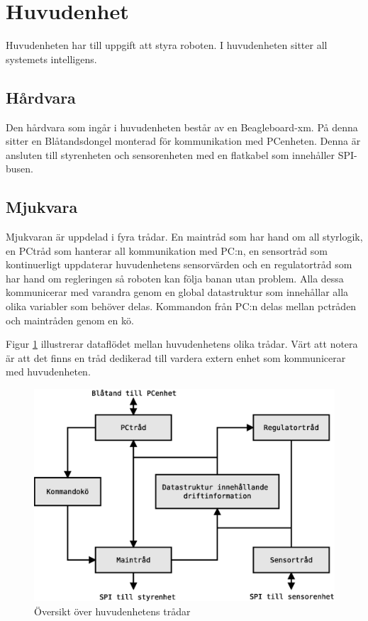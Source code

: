 
\section{Huvudenhet}
Huvudenheten har till uppgift att styra roboten. I huvudenheten sitter all systemets intelligens.

\subsection{Hårdvara}
Den hårdvara som ingår i huvudenheten består av en Beagleboard-xm. På denna sitter en Blåtandsdongel monterad för kommunikation med PCenheten. Denna är ansluten till styrenheten och sensorenheten med en flatkabel som innehåller SPI-busen.

\subsection{Mjukvara}
Mjukvaran är uppdelad i fyra trådar. En maintråd som har hand om all styrlogik, en PCtråd som hanterar all kommunikation med PC:n, en sensortråd som kontinuerligt uppdaterar huvudenhetens sensorvärden och en regulatortråd som har hand om regleringen så roboten kan följa banan utan problem. Alla dessa kommunicerar med varandra genom en global datastruktur som innehållar alla olika variabler som behöver delas. Kommandon från PC:n delas mellan pctråden och maintråden genom en kö.

Figur \ref{huvud-tradar} illustrerar dataflödet mellan huvudenhetens olika trådar. Värt att notera är att det finns en tråd dedikerad till vardera extern enhet som kommunicerar med huvudenheten.

\begin{figure}[h!]
	\centering
	\includegraphics[scale=0.5]{grafik/huvud-tradar}
	\caption{Översikt över huvudenhetens trådar} \label{huvud-tradar}
\end{figure}

